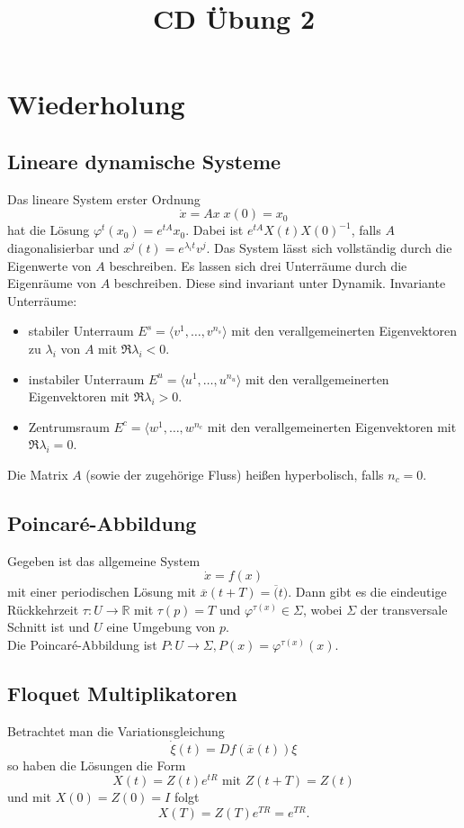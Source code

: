 \documentclass[a4paper]{article}
\title{CD Übung 2}
\begin{document}
\section*{Wiederholung}
\subsection*{Lineare dynamische Systeme}
Das lineare System erster Ordnung
\begin{equation}
\label{eqn:linSys}
\dot x = Ax \; x(0) = x_0
\end{equation}
hat die Lösung $φ^t(x_0) = e^{tA}x_0$. Dabei ist $e^{tA} X(t) X(0)^{-1}$, falls $A$ diagonalisierbar und $x^j(t) = e^{λ_i t}v^j$.
Das System lässt sich vollständig durch die Eigenwerte von $A$ beschreiben. 
Es lassen sich drei Unterräume durch die Eigenräume von $A$ beschreiben.
Diese sind invariant unter Dynamik.
Invariante Unterräume: 
\begin{itemize}
\item stabiler Unterraum $E^s = \langle v^1, …, v^{n_s} \rangle$ mit den verallgemeinerten Eigenvektoren zu $λ_i$ von $A$ mit $\Re λ_i < 0$.
\item instabiler Unterraum $E^u = \langle u^1, …, u^{n_u}\rangle$ mit den verallgemeinerten Eigenvektoren mit $\Re λ_i > 0$.
\item Zentrumsraum $E^c = \langle w^1, …, w^{n_c}$ mit den verallgemeinerten Eigenvektoren mit $\Re λ_i = 0$.
\end{itemize}
Die Matrix $A$ (sowie der zugehörige Fluss) heißen hyperbolisch, falls $n_c = 0$.

\subsection*{Poincaré-Abbildung}
Gegeben ist das allgemeine System
\begin{equation}
\dot x = f(x)
\end{equation}
mit einer periodischen Lösung mit $\overline x(t+T) = \overline(t)$. Dann gibt es die eindeutige Rückkehrzeit $τ\colon U\to ℝ$ mit $τ(p) = T$ und $φ^{τ(x)} \in Σ$, wobei $Σ$ der transversale Schnitt ist und $U$ eine Umgebung von $p$.\\
Die Poincaré-Abbildung ist $P\colon U \to Σ, P(x) = φ^{τ(x)}(x)$.

\subsection*{Floquet Multiplikatoren}
Betrachtet man die Variationsgleichung
\begin{equation}
\dot ξ(t) = Df(\overline x(t)) ξ
\end{equation}
so haben die Lösungen die Form
$$X(t) = Z(t) e^{tR} \text{ mit } Z(t+T) = Z(t)$$
und mit $X(0) = Z(0) = I$ folgt
$$X(T) = Z(T) e^{TR} = e^{TR}.$$
\end{document}
